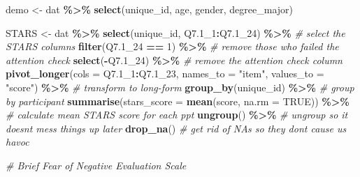 \documentclass[
  oneside]{book}
\newenvironment{Shaded}{\begin{snugshade}}{\end{snugshade}}
\newcommand{\AttributeTok}[1]{\textcolor[rgb]{0.13,0.29,0.53}{#1}}
\newcommand{\CommentTok}[1]{\textcolor[rgb]{0.56,0.35,0.01}{\textit{#1}}}
\newcommand{\ConstantTok}[1]{\textcolor[rgb]{0.56,0.35,0.01}{#1}}
\newcommand{\DecValTok}[1]{\textcolor[rgb]{0.00,0.00,0.81}{#1}}
\newcommand{\FloatTok}[1]{\textcolor[rgb]{0.00,0.00,0.81}{#1}}
\newcommand{\FunctionTok}[1]{\textcolor[rgb]{0.13,0.29,0.53}{\textbf{#1}}}
\newcommand{\NormalTok}[1]{#1}
\newcommand{\OtherTok}[1]{\textcolor[rgb]{0.56,0.35,0.01}{#1}}
\newcommand{\SpecialCharTok}[1]{\textcolor[rgb]{0.81,0.36,0.00}{\textbf{#1}}}
\newcommand{\StringTok}[1]{\textcolor[rgb]{0.31,0.60,0.02}{#1}}
\begin{document}
\begin{Shaded}
\begin{Highlighting}[]
\NormalTok{demo }\OtherTok{\textless{}{-}}\NormalTok{ dat }\SpecialCharTok{\%\textgreater{}\%}
  \FunctionTok{select}\NormalTok{(unique\_id, age, gender, degree\_major)}

\NormalTok{STARS }\OtherTok{\textless{}{-}}\NormalTok{ dat }\SpecialCharTok{\%\textgreater{}\%}
  \FunctionTok{select}\NormalTok{(unique\_id, Q7}\FloatTok{.1}\NormalTok{\_1}\SpecialCharTok{:}\NormalTok{Q7}\FloatTok{.1}\NormalTok{\_24) }\SpecialCharTok{\%\textgreater{}\%} \CommentTok{\# select the STARS columns}
  \FunctionTok{filter}\NormalTok{(Q7}\FloatTok{.1}\NormalTok{\_24 }\SpecialCharTok{==} \DecValTok{1}\NormalTok{) }\SpecialCharTok{\%\textgreater{}\%} \CommentTok{\# remove those who failed the attention check}
  \FunctionTok{select}\NormalTok{(}\SpecialCharTok{{-}}\NormalTok{Q7}\FloatTok{.1}\NormalTok{\_24) }\SpecialCharTok{\%\textgreater{}\%} \CommentTok{\# remove the attention check column}
  \FunctionTok{pivot\_longer}\NormalTok{(}\AttributeTok{cols =}\NormalTok{ Q7}\FloatTok{.1}\NormalTok{\_1}\SpecialCharTok{:}\NormalTok{Q7}\FloatTok{.1}\NormalTok{\_23, }\AttributeTok{names\_to =} \StringTok{"item"}\NormalTok{, }\AttributeTok{values\_to =} \StringTok{"score"}\NormalTok{) }\SpecialCharTok{\%\textgreater{}\%} \CommentTok{\# transform to long{-}form}
  \FunctionTok{group\_by}\NormalTok{(unique\_id) }\SpecialCharTok{\%\textgreater{}\%} \CommentTok{\# group by participant}
  \FunctionTok{summarise}\NormalTok{(}\AttributeTok{stars\_score =} \FunctionTok{mean}\NormalTok{(score, }\AttributeTok{na.rm =} \ConstantTok{TRUE}\NormalTok{)) }\SpecialCharTok{\%\textgreater{}\%} \CommentTok{\# calculate mean STARS score for each ppt}
  \FunctionTok{ungroup}\NormalTok{() }\SpecialCharTok{\%\textgreater{}\%} \CommentTok{\# ungroup so it doesn\textquotesingle{}t mess things up later}
  \FunctionTok{drop\_na}\NormalTok{() }\CommentTok{\#  get rid of NAs so they don\textquotesingle{}t cause us havoc}

\CommentTok{\# Brief Fear of Negative Evaluation Scale}


\end{Highlighting}
\end{Shaded}
\end{document}
